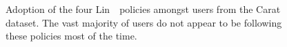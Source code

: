 \documentclass[thesis.tex]{subfiles}
\begin{document}
\begin{figure}
  \centering
  \\
  \\
  \vspace{2em}
  \caption[Adoption of Lin~\etal~policies.]{Adoption of the four Lin~\etal~policies amongst users from the Carat dataset.  The vast majority of users do not appear to be following these policies most of the time.}
  \label{fig:lin_uptake_graphs}
\end{figure}
\end{document}

